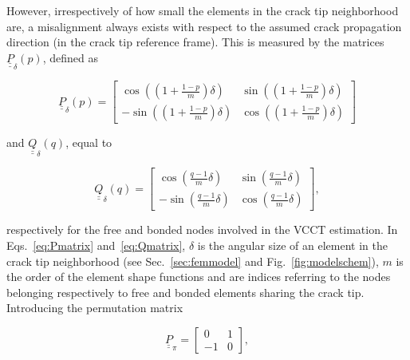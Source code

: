 \documentclass[review]{elsarticle}
\begin{document}
However, irrespectively of how small the elements in the crack tip neighborhood are, a misalignment always exists with respect to the assumed crack propagation direction (in the crack tip reference frame). This is measured by the matrices $\underline{\underline{P}}_{\delta}\left(p\right)$, defined as

\begin{equation}\label{eq:Pmatrix}
\underline{\underline{P}}_{\delta}\left(p\right)=\begin{bmatrix}
\cos\left(\left(1+\frac{1-p}{m}\right)\delta\right) & \sin\left(\left(1+\frac{1-p}{m}\right)\delta\right) \\
-\sin\left(\left(1+\frac{1-p}{m}\right)\delta\right) & \cos\left(\left(1+\frac{1-p}{m}\right)\delta\right)
\end{bmatrix}
\end{equation}

 and $\underline{\underline{Q}}_{\delta}\left(q\right)$, equal to 

\begin{equation}\label{eq:Qmatrix}
\underline{\underline{Q}}_{\delta}\left(q\right)=\begin{bmatrix}
\cos\left(\frac{q-1}{m}\delta\right) & \sin\left(\frac{q-1}{m}\delta\right) \\
-\sin\left(\frac{q-1}{m}\delta\right) & \cos\left(\frac{q-1}{m}\delta\right)
\end{bmatrix},
\end{equation}

respectively for the free and bonded nodes involved in the VCCT estimation. In Eqs.~\ref{eq:Pmatrix} and~\ref{eq:Qmatrix}, $\delta$ is the angular size of an element in the crack tip neighborhood (see Sec.~\ref{sec:femmodel} and Fig.~\ref{fig:modelschem}), $m$ is the order of the element shape functions and  are indices referring to the nodes belonging respectively to free and bonded elements sharing the crack tip.  Introducing the permutation matrix


\begin{equation}
\underline{\underline{P}}_{\pi}=\begin{bmatrix}
0 & 1\\
-1& 0
\end{bmatrix},
\end{equation}
\end{document}
